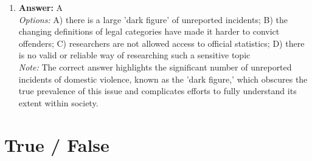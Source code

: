 \documentclass[12pt]{article}
\begin{document}
\begin{enumerate}[label=\arabic*.]
\item \textbf{Answer:} A
\\ \textit{Options:} A) there is a large 'dark figure' of unreported incidents; B) the changing definitions of legal categories have made it harder to convict offenders; C) researchers are not allowed access to official statistics; D) there is no valid or reliable way of researching such a sensitive topic
\\ \textit{Note:} The correct answer highlights the significant number of unreported incidents of domestic violence, known as the 'dark figure,' which obscures the true prevalence of this issue and complicates efforts to fully understand its extent within society.
\end{enumerate}

\section*{True / False}
\end{document}
